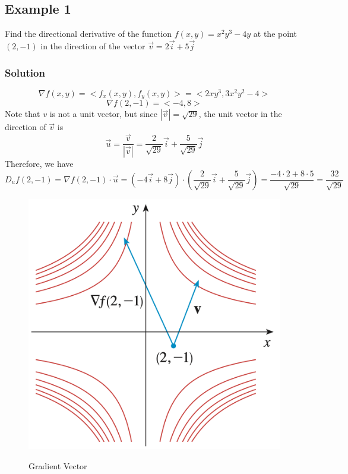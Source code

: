 \subsection{Example 1}
Find the directional derivative of the function $f(x, y)=x^2y^3-4y$ at the point $(2, -1)$ in the direction of the vector $\vec{v}=2\vec{i} + 5\vec{j}$

\subsubsection{Solution}
$$
    \nabla f(x, y)=<f_x(x, y), f_y(x, y)>=<2xy^3, 3x^2y^2 - 4>
$$
$$
    \nabla f(2, -1)=<-4, 8>
$$
Note that $v$ is not a unit vector, but since $|\vec{v}|=\sqrt{29}$, the unit vector in the direction of $\vec{v}$ is
$$
    \vec{u}=\frac{\vec{v}}{|\vec{v}|}=\frac{2}{\sqrt{29}}\vec{i} + \frac{5}{\sqrt{29}}\vec{j}
$$
Therefore, we have
$$
    D_uf(2, -1)=\nabla f(2, -1) \cdot \vec{u} = (-4 \vec{i} + 8 \vec{j}) \cdot (\frac{2}{\sqrt{29}}\vec{i} + \frac{5}{\sqrt{29}}\vec{j})=\frac{-4 \cdot 2 + 8 \cdot 5}{\sqrt{29}} = \frac{32}{\sqrt{29}}
$$

\begin{figure}[h]
    \centering
    \cite{calculus}
    \includegraphics[scale=0.6]{chapter002/figures/fig004}
    \caption{Gradient Vector}
    \label{fig:Gradient Vector}
\end{figure}

